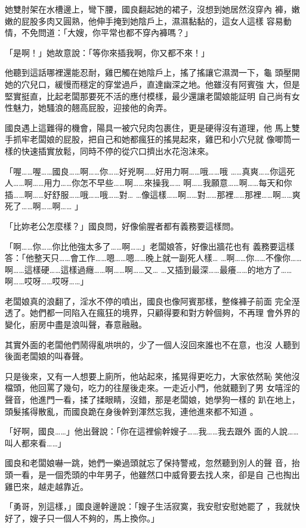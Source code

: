 她雙肘架在水槽邊上，彎下腰，國良翻起她的裙子，沒想到她居然沒穿內
褲，嫩嫩的屁股多肉又圓熟，他伸手掩到她陰戶上，濕濕黏黏的，這女人這樣
容易動情，不免問道：「大嫂，你平常也都不穿內褲嗎？」

「是啊！」她故意說：「等你來插我啊，你又都不來！」

他聽到這話哪裡還能忍耐，雞巴觸在她陰戶上，搖了搖讓它濕潤一下，龜
頭壓開她的穴兒口，緩慢而穩定的穿堂過戶，直達幽深之地。他雖沒有阿賓強
大，但是堅實挺直，比起老闆那要死不活的應付模樣，最少還讓老闆娘能証明
自己尚有女性魅力，她騷浪的翹高屁股，迎接他的肏弄。

國良遇上這難得的機會，陽具一被穴兒肉包裹住，更是硬得沒有道理，他
馬上雙手抓牢老闆娘的屁股，把自己和她都瘋狂的搖晃起來，雞巴和小穴兒就
像唧筒一樣的快速插實放鬆，同時不停的從穴口擠出水花泡沫來。

「喔……喔……國良……啊……你……好兇啊……好用力啊……哦……哦
……真爽……你這死人……啊……用力……你怎不早些……啊……來操我……
啊……我願意……啊……每天和你插……啊……好舒服……哦……哦……對…
…像這樣……啊……對……那裡……那裡……啊……爽死了……啊……啊……
」

「比妳老公怎麼樣？」國良問，好像偷腥者都有義務要這樣問。

「啊……你……你比他強太多了……啊……」老闆娘答，好像出牆花也有
義務要這樣答：「他整天只……會工作……嗯……嗯……晚上就一副死人樣…
…啊……你……不像你……啊……這樣硬……這樣過癮……啊……啊……又…
…又插到最深……最癢……的地方了……啊……哎呀……哎呀……」

老闆娘真的浪翻了，淫水不停的噴出，國良也像阿賓那樣，整條褲子前面
完全溼透了。她們都一同陷入在瘋狂的境界，只顧得要和對方幹個夠，不再理
會外界的變化，廚房中盡是浪叫聲，春意融融。

其實外面的老闆他們鬧得亂哄哄的，少了一個人沒回來誰也不在意，也沒
人聽到後面老闆娘的叫春聲。

只是後來，又有一人想要上廁所，他站起來，搖晃得更吃力，大家依然恥
笑他沒檔頭，他回罵了幾句，吃力的往屋後走來。一走近小門，他就聽到了男
女嘻淫的聲音，他進門一看，揉了揉眼睛，沒錯，那是老闆娘，她學狗一樣的
趴在地上，頭髮搖得散亂，而國良跪在身後幹到渾然忘我，連他進來都不知道
。

「好啊，國良……」他出聲說：「你在這裡偷幹嫂子……我……我去跟外
面的人說……叫人都來看……」

國良和老闆娘嚇一跳，她們一樂過頭就忘了保持警戒，忽然聽到別人的聲
音，抬頭一看，是一個禿頭的中年男子，他雖然口中威脅要去找人來，卻是自
己也掏出雞巴來，越走越靠近。

「勇哥，別這樣，」國良邊幹邊說：「嫂子生活寂寞，我安慰安慰她罷了
，我就快好了，嫂子只一個人不夠的，馬上換你。」


